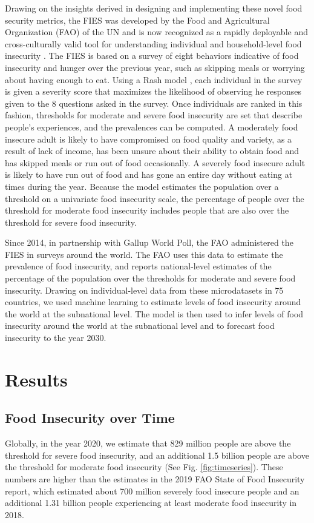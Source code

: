 \documentclass{article}
\begin{document}
Drawing on the insights derived in designing and implementing these novel food security metrics, the FIES was developed by the Food and Agricultural Organization (FAO) of the UN \cite{Ballard2013} and is now recognized as a rapidly deployable and cross-culturally valid tool for understanding individual and household-level food insecurity \citep{wambogo2018validity, smith2017world}.  The FIES is based on a survey of eight behaviors indicative of food insecurity and hunger over the previous year, such as skipping meals or worrying about having enough to eat.  Using a Rash model \citep{Cafiero2018}, each individual in the survey is given a severity score that maximizes the likelihood of observing he responses given to the 8 questions asked in the survey.  Once individuals are ranked in this fashion, thresholds for moderate and severe food insecurity are set that describe people's experiences, and the prevalences can be computed. A moderately food insecure adult is likely to have compromised on food quality and variety, as a result of lack of income, has been unsure about their ability to obtain food and has skipped meals or run out of food occasionally. A severely food insecure adult is likely to have run out of food and has gone an entire day without eating at times during the year.  Because the model estimates the population over a threshold on a univariate food insecurity scale, the percentage of people over the threshold for moderate food insecurity includes people that are also over the threshold for severe food insecurity.

Since 2014, in partnership with Gallup World Poll, the FAO administered the FIES in surveys around the world. The FAO uses this data to estimate the prevalence of food insecurity, and reports national-level estimates of the percentage of the population over the thresholds for moderate and severe food insecurity.  Drawing on individual-level data from these microdatasets in 75 countries, we used machine learning to estimate levels of food insecurity around the world at the subnational level.  The model is then used to infer levels of food insecurity around the world at the subnational level and to forecast food insecurity to the year 2030.

\section{Results}
\subsection{Food Insecurity over Time}
Globally, in the year 2020, we estimate that 829 million people are above the threshold for severe food insecurity, and an additional 1.5 billion people are above the threshold for moderate food insecurity (See Fig. \ref{fig:timeseries}). These numbers are higher than the estimates in the 2019 FAO State of Food Insecurity report, which estimated about 700 million severely food insecure people and an additional 1.31 billion people experiencing at least moderate food insecurity in 2018. 
\end{document}
